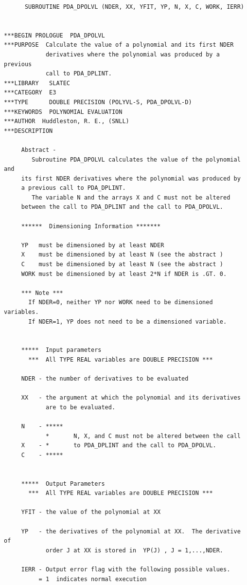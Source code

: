 \documentclass[11pt,twoside]{article}
\begin{document}
\begin{verbatim}
      SUBROUTINE PDA_DPOLVL (NDER, XX, YFIT, YP, N, X, C, WORK, IERR)


***BEGIN PROLOGUE  PDA_DPOLVL
***PURPOSE  Calculate the value of a polynomial and its first NDER
            derivatives where the polynomial was produced by a previous
            call to PDA_DPLINT.
***LIBRARY   SLATEC
***CATEGORY  E3
***TYPE      DOUBLE PRECISION (POLYVL-S, PDA_DPOLVL-D)
***KEYWORDS  POLYNOMIAL EVALUATION
***AUTHOR  Huddleston, R. E., (SNLL)
***DESCRIPTION

     Abstract -
        Subroutine PDA_DPOLVL calculates the value of the polynomial and
     its first NDER derivatives where the polynomial was produced by
     a previous call to PDA_DPLINT.
        The variable N and the arrays X and C must not be altered
     between the call to PDA_DPLINT and the call to PDA_DPOLVL.

     ******  Dimensioning Information *******

     YP   must be dimensioned by at least NDER
     X    must be dimensioned by at least N (see the abstract )
     C    must be dimensioned by at least N (see the abstract )
     WORK must be dimensioned by at least 2*N if NDER is .GT. 0.

     *** Note ***
       If NDER=0, neither YP nor WORK need to be dimensioned variables.
       If NDER=1, YP does not need to be a dimensioned variable.


     *****  Input parameters
       ***  All TYPE REAL variables are DOUBLE PRECISION ***

     NDER - the number of derivatives to be evaluated

     XX   - the argument at which the polynomial and its derivatives
            are to be evaluated.

     N    - *****
            *       N, X, and C must not be altered between the call
     X    - *       to PDA_DPLINT and the call to PDA_DPOLVL.
     C    - *****


     *****  Output Parameters
       ***  All TYPE REAL variables are DOUBLE PRECISION ***

     YFIT - the value of the polynomial at XX

     YP   - the derivatives of the polynomial at XX.  The derivative of
            order J at XX is stored in  YP(J) , J = 1,...,NDER.

     IERR - Output error flag with the following possible values.
          = 1  indicates normal execution


\end{verbatim}
\end{document}
